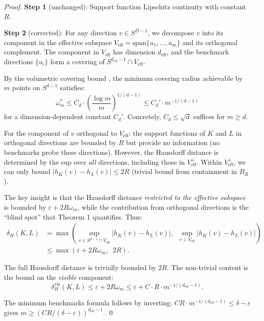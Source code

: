 \begin{proof}
\textbf{Step 1} (unchanged): Support function Lipschitz continuity with constant $R$.

\textbf{Step 2} (corrected): For any direction $v \in S^{D-1}$, we decompose $v$ into its component in the effective subspace $V_{\mathrm{eff}} = \mathrm{span}\{u_1, \ldots, u_m\}$ and its orthogonal complement. The component in $V_{\mathrm{eff}}$ has dimension $d_{\mathrm{eff}}$, and the benchmark directions $\{u_i\}$ form a covering of $S^{d_{\mathrm{eff}} - 1} \cap V_{\mathrm{eff}}$.

By the volumetric covering bound \cite{rogers1963covering}, the minimum covering radius achievable by $m$ points on $S^{d-1}$ satisfies:
\[
  \omega_m^* \leq C_d \cdot \left(\frac{\log m}{m}\right)^{1/(d-1)} \leq C_d' \cdot m^{-1/(d-1)}
\]
for a dimension-dependent constant $C_d'$. Concretely, $C_d \leq \sqrt{d}$ suffices for $m \geq d$.

For the component of $v$ orthogonal to $V_{\mathrm{eff}}$: the support functions of $K$ and $L$ in orthogonal directions are bounded by $R$ but provide no information (no benchmarks probe these directions). However, the Hausdorff distance is determined by the sup over \emph{all} directions, including those in $V_{\mathrm{eff}}^\perp$. Within $V_{\mathrm{eff}}^\perp$, we can only bound $|h_K(v) - h_L(v)| \leq 2R$ (trivial bound from containment in $B_R$).

The key insight is that the Hausdorff distance \emph{restricted to the effective subspace} is bounded by $\varepsilon + 2R\omega_m$, while the contribution from orthogonal directions is the ``blind spot'' that Theorem 1 quantifies. Thus:
\begin{align}
  \delta_H(K, L) &= \max\!\left(\sup_{v \in S^{d-1} \cap V_{\mathrm{eff}}} |h_K(v) - h_L(v)|,\;\; \sup_{v \perp V_{\mathrm{eff}}} |h_K(v) - h_L(v)|\right) \\
  &\leq \max\!\left(\varepsilon + 2R\omega_m,\;\; 2R\right).
\end{align}

The full Hausdorff distance is trivially bounded by $2R$. The non-trivial content is the bound on the \emph{visible} component:
\[
  \delta_H^{\mathrm{vis}}(K, L) \leq \varepsilon + 2R\omega_m \leq \varepsilon + C \cdot R \cdot m^{-1/(d_{\mathrm{eff}} - 1)}.
\]

The minimum benchmarks formula follows by inverting: $CR \cdot m^{-1/(d_{\mathrm{eff}}-1)} \leq \delta - \varepsilon$ gives $m \geq (CR/(\delta - \varepsilon))^{d_{\mathrm{eff}}-1}$. \qed
\end{proof}

